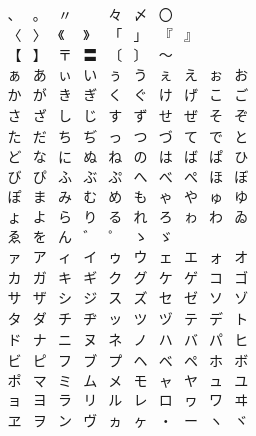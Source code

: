 \documentclass{standalone}
\begin{document}
$\displaystyle
  \begin{array}{cccccccccc}
    、&。&〃&　&々&〆&〇&　&　&　\\
    〈&〉&《&》&「&」&『&』&　&　\\
    【&】&〒&〓&〔&〕&〜&　&　&　\\
    ぁ&あ&ぃ&い&ぅ&う&ぇ&え&ぉ&お\\
    か&が&き&ぎ&く&ぐ&け&げ&こ&ご\\
    さ&ざ&し&じ&す&ず&せ&ぜ&そ&ぞ\\
    た&だ&ち&ぢ&っ&つ&づ&て&で&と\\
    ど&な&に&ぬ&ね&の&は&ば&ぱ&ひ\\
    び&ぴ&ふ&ぶ&ぷ&へ&べ&ぺ&ほ&ぼ\\
    ぽ&ま&み&む&め&も&ゃ&や&ゅ&ゆ\\
    ょ&よ&ら&り&る&れ&ろ&ゎ&わ&ゐ\\
    ゑ&を&ん&゛&゜&ゝ&ゞ&　&　&　\\
    ァ&ア&ィ&イ&ゥ&ウ&ェ&エ&ォ&オ\\
    カ&ガ&キ&ギ&ク&グ&ケ&ゲ&コ&ゴ\\
    サ&ザ&シ&ジ&ス&ズ&セ&ゼ&ソ&ゾ\\
    タ&ダ&チ&ヂ&ッ&ツ&ヅ&テ&デ&ト\\
    ド&ナ&ニ&ヌ&ネ&ノ&ハ&バ&パ&ヒ\\
    ビ&ピ&フ&ブ&プ&ヘ&ベ&ペ&ホ&ボ\\
    ポ&マ&ミ&ム&メ&モ&ャ&ヤ&ュ&ユ\\
    ョ&ヨ&ラ&リ&ル&レ&ロ&ヮ&ワ&ヰ\\
    ヱ&ヲ&ン&ヴ&ヵ&ヶ&・&ー&ヽ&ヾ
  \end{array}
$
\end{document}
